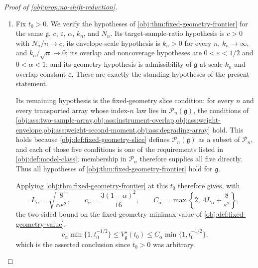 \documentclass[11pt]{article}
\begin{document}
\begin{proof}[Proof of \cref{obj:prop:no-shift-reduction}]
\begin{enumerate}
By the first step \(\kappa_n=1\), so \(\kappa_n^P=1\), and substituting this into the display for \(t_n\) yields
\[
t_n
=
\frac{n\mu_n^2}{\kappa_n^P}
=
\frac{n\mu_n^2}{\kappa_n}
=
\frac{n\mu_n^2}{1}
=
n\mu_n^2 .
\]

\item Fix \(t_0>0\).  We verify the hypotheses of \cref{obj:thm:fixed-geometry-frontier} for the same \(\mathfrak g\), \(c\), \(\varepsilon\), \(\alpha\), \(k_n\), and \(N_n\).  Its target-sample-ratio hypothesis is \(c>0\) with \(N_n/n\to c\); its envelope-scale hypothesis is \(k_n>0\) for every \(n\), \(k_n\to\infty\), and \(k_n/\sqrt n\to0\); its overlap and noncoverage hypotheses are \(0<\varepsilon<1/2\) and \(0<\alpha<1\); and its geometry hypothesis is admissibility of \(\mathfrak g\) at scale \(k_n\) and overlap constant \(\varepsilon\).  These are exactly the standing hypotheses of the present statement.

Its remaining hypothesis is the fixed-geometry slice condition: for every \(n\) and every transported array whose index-\(n\) law lies in \(\mathcal P_n(\mathfrak g)\), the conditions of \cref{obj:ass:two-sample-array,obj:ass:instrument-overlap,obj:ass:weight-envelope,obj:ass:weight-second-moment,obj:ass:degrading-array} hold.  This holds because \cref{obj:def:fixed-geometry-slice} defines \(\mathcal P_n(\mathfrak g)\) as a subset of \(\mathcal P_n\), and each of those five conditions is one of the requirements listed in \cref{obj:def:model-class}; membership in \(\mathcal P_n\) therefore supplies all five directly.  Thus all hypotheses of \cref{obj:thm:fixed-geometry-frontier} hold for \(\mathfrak g\).

Applying \cref{obj:thm:fixed-geometry-frontier} at this \(t_0\) therefore gives, with
\[
L_\alpha=\sqrt{\frac{8}{\alpha\varepsilon^2}},
\qquad
c_\alpha=\frac{3(1-\alpha)^2}{16},
\qquad
C_\alpha=\max\left\{2,\;4L_\alpha+\frac{8}{\varepsilon^2}\right\},
\]
the two-sided bound on the fixed-geometry minimax value of \cref{obj:def:fixed-geometry-value},
\[
c_\alpha \min\{1,t_0^{-1/2}\}
\le
V_{\mathfrak g}^\star(t_0)
\le
C_\alpha \min\{1,t_0^{-1/2}\},
\]
which is the asserted conclusion since \(t_0>0\) was arbitrary.

\end{enumerate}
\end{proof}
\end{document}
